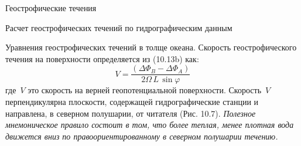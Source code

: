 \begin{chapter}{Геострофические течения}
\begin{section}{Расчет геострофических течений по гидрографическим данным}
\begin{paragraph}{Уравнения геострофических течений в толще океана.}
Скорость геострофического течения на поверхности определяется 
из (10.13b) как:
\begin{equation}
  V =\frac{\left(\Delta\Phi_B - \Delta\Phi_A\right)}{2\Omega\,L\, \sin\varphi }
\end{equation}
где~$V$ это скорость на верней геопотенциальной поверхности. Скорость~$V$
перпендикулярна плоскости, содержащей гидрографические станции и
направлена, в северном полушарии, от читателя (Рис. 10.7). \emph{Полезное
мнемоническое правило состоит в том, что более теплая, менее плотная
вода движется вниз по правоориентированному в северном полушарии
течению.}
%


\end{paragraph}
\end{section}
\end{chapter}
